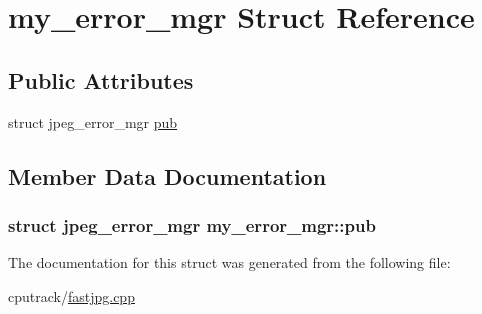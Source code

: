 \hypertarget{structmy__error__mgr}{}\section{my\+\_\+error\+\_\+mgr Struct Reference}
\label{structmy__error__mgr}
\subsection*{Public Attributes}
\begin{DoxyCompactItemize}
\item 
struct jpeg\+\_\+error\+\_\+mgr \hyperlink{structmy__error__mgr_aac1fb61cc51b4d8edbb44ba85fcccdb4}{pub}
\end{DoxyCompactItemize}


\subsection{Member Data Documentation}
\subsubsection[{\texorpdfstring{pub}{pub}}]{\setlength{\rightskip}{0pt plus 5cm}struct jpeg\+\_\+error\+\_\+mgr my\+\_\+error\+\_\+mgr\+::pub}\hypertarget{structmy__error__mgr_aac1fb61cc51b4d8edbb44ba85fcccdb4}{}\label{structmy__error__mgr_aac1fb61cc51b4d8edbb44ba85fcccdb4}


The documentation for this struct was generated from the following file\+:\begin{DoxyCompactItemize}
\item 
cputrack/\hyperlink{fastjpg_8cpp}{fastjpg.\+cpp}\end{DoxyCompactItemize}
